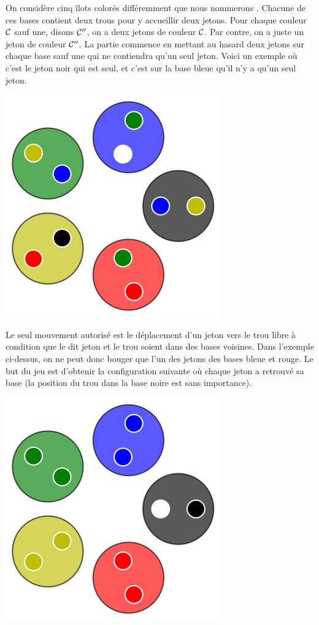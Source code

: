 On considère cinq îlots colorés différemment que nous nommerons . Chacune de ces bases contient deux trous pour y accueillir deux jetons.
Pour chaque couleur $\cal C$ sauf une, disons $\cal C^{\prime\prime}$, on a deux jetons de couleur $\cal C$.
Par contre, on a juste un jeton de couleur $\cal C^{\prime\prime}$.
La partie commence en mettant au hasard deux jetons sur chaque base sauf une qui ne contiendra qu'un seul jeton.
Voici un exemple où c'est le jeton noir qui est seul, et c'est sur la base bleue qu'il n'y a qu'un seul jeton.

\begin{center}   %
    \includegraphics[scale= 0.3]{content/rules/start.png}
\end{center}

Le seul mouvement autorisé est le déplacement d'un jeton vers le trou libre à condition que le dit jeton et le trou soient dans des bases  voisines. Dans l'exemple ci-dessus, on ne peut donc bouger que l'un des jetons des bases bleue et rouge. Le but du jeu est d'obtenir la configuration suivante où chaque jeton a retrouvé sa base (la position du trou dans la base noire est sans importance).

\begin{center}
    \includegraphics[scale= 0.3]{content/rules/end.png}
\end{center}

